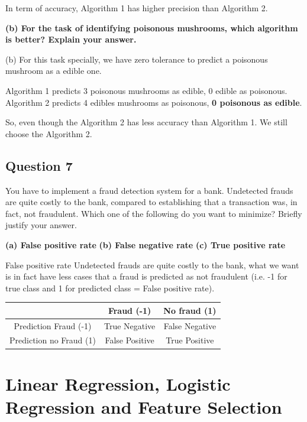 \documentclass{article}
\begin{document}
In term of accuracy, Algorithm 1 has higher precision than Algorithm 2.

\vspace{1em}
{\bf (b) For the task of identifying poisonous mushrooms, which algorithm is better? Explain your answer.}


(b) For this task specially, we have zero tolerance to predict a poisonous mushroom as a edible one. 

Algorithm 1 predicts 3 poisonous mushrooms as edible, 0 edible as poisonous. Algorithm 2 predicts 4 edibles mushrooms as poisonous, \textbf{0 poisonous as edible}.

So, even though the Algorithm 2 has less accuracy than Algorithm 1. We still choose the Algorithm 2.




\subsection{Question 7}

You have to implement a fraud detection system for a bank. Undetected frauds are quite costly to the bank, compared to establishing that a transaction was, in fact, not fraudulent. Which one of the following do you want to minimize? Briefly justify your answer.

{\bf (a) False positive rate}
\vspace{1em}
{\bf (b) False negative rate}
\vspace{1em}
{\bf (c) True positive rate}

False positive rate
Undetected frauds are quite costly to the bank, what we want is in fact have less cases that a fraud is predicted as not fraudulent (i.e. -1 for true class and 1 for predicted class = False positive rate).

\begin{center}
\begin{tabular}{| c | c | c |}
	\hline
	 & Fraud (-1)&No fraud (1) \\  \hline  
	Prediction Fraud (-1) &True Negative&False Negative \\   \hline  
	Prediction no Fraud (1)&False Positive&True Positive\\     
	\hline
\end{tabular}
\end{center}


\newpage
\section{Linear Regression, Logistic Regression and Feature Selection}
\end{document}
